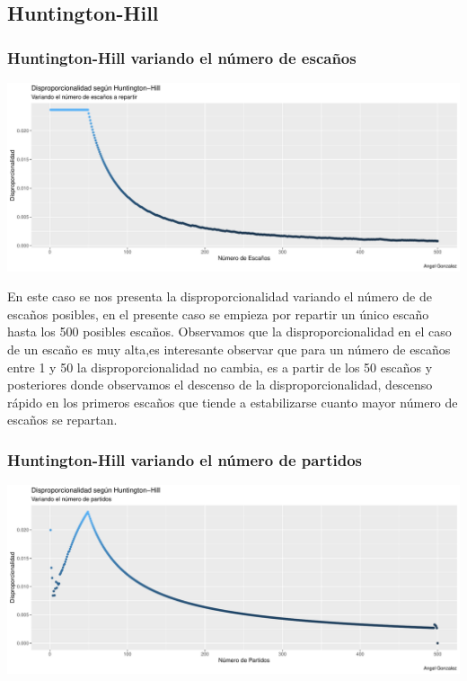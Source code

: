 \documentclass[12pt,a4paper,]{book}
\numberwithin{dummy}{section}
\theoremstyle{ocrenumbox}
\theoremstyle{blacknumex}
\theoremstyle{blacknumbox}
\theoremstyle{ocrenum}
\theoremstyle{ocrenum}
\begin{document}
\hypertarget{huntington-hill}{%
\subsection{Huntington-Hill}\label{huntington-hill}}

\hypertarget{huntington-hill-variando-el-nuxfamero-de-escauxf1os}{%
\subsubsection{Huntington-Hill variando el número de
escaños}\label{huntington-hill-variando-el-nuxfamero-de-escauxf1os}}

\begin{center}\includegraphics[width=0.95\linewidth]{figurasR/unnamed-chunk-29-1} \end{center}

En este caso se nos presenta la disproporcionalidad variando el número
de de escaños posibles, en el presente caso se empieza por repartir un
único escaño hasta los 500 posibles escaños. Observamos que la
disproporcionalidad en el caso de un escaño es muy alta,es interesante
observar que para un número de escaños entre 1 y 50 la
disproporcionalidad no cambia, es a partir de los 50 escaños y
posteriores donde observamos el descenso de la disproporcionalidad,
descenso rápido en los primeros escaños que tiende a estabilizarse
cuanto mayor número de escaños se repartan.

\hypertarget{huntington-hill-variando-el-nuxfamero-de-partidos}{%
\subsubsection{Huntington-Hill variando el número de
partidos}\label{huntington-hill-variando-el-nuxfamero-de-partidos}}

\begin{center}\includegraphics[width=0.95\linewidth]{figurasR/unnamed-chunk-30-1} \end{center}
\end{document}
